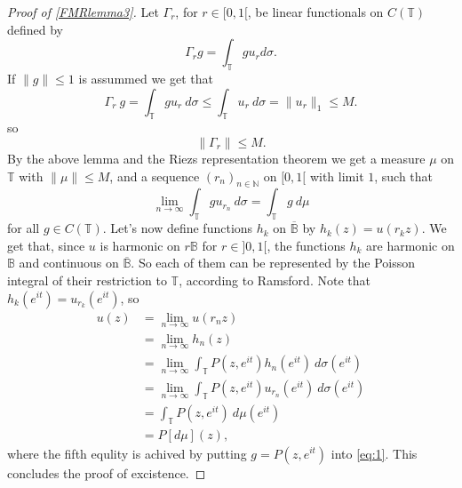 \documentclass[a4paper,12pt,twoside,BCOR=10mm]{scrbook}
\begin{document}
\begin{proof}[Proof of \ref{FMRlemma3}]
Let $\Gamma_r$, for $r \in [0, 1[$,  be linear functionals on $C(\mathbb{T})$ defined by
\[
	\Gamma_r g = \int_{\mathbb{T}} gu_r d\sigma.
\]
If $\|g\| \leq 1$ is assummed we get that
\[
\Gamma_r\ g = \int_{\mathbb{T}} gu_r\ d\sigma \leq \int_{\mathbb{T}} u_r\ d\sigma = \|u_r\|_1 \leq M.
\]
so
\[
	\|\Gamma_r\| \leq M.
\]
By the above lemma %
and the Riezs representation theorem %
we get a measure $\mu$ on $\mathbb{T}$ with $\|\mu\| \leq M$, and a sequence $(r_n)_{n \in \mathbb{N}}$ on $[0, 1[$ with limit $1$, such that
\begin{equation}
	\label{eq:1}
	\lim_{n \rightarrow \infty} \int_{\mathbb{T}} gu_{r_n}\ d\sigma = \int_{\mathbb{T}}g\ d\mu
\end{equation}
for all $g \in C(\mathbb{T})$.
Let's now define functions $h_k$ on $\overline{\mathbb{B}}$ by $h_k(z) = u(r_kz)$.
We get that, since $u$ is harmonic on $r\mathbb{B}$ for $r \in ]0, 1[$, the functions $h_k$ are harmonic on $\mathbb{B}$ and continuous on $\overline{\mathbb{B}}$.
So each of them can be represented by the Poisson integral of their restriction to $\mathbb{T}$, according to Ramsford. %
Note that $h_k(e^{it}) = u_{r_k}(e^{it})$, so
\begin{align*}
	u(z)
	&= \lim_{n \rightarrow \infty} u(r_nz)\\
	&= \lim_{n \rightarrow \infty} h_n(z)\\
	&= \lim_{n \rightarrow \infty} \int_{\mathbb{T}}P(z, e^{it}) h_n(e^{it})\ d\sigma(e^{it})\\
	&= \lim_{n \rightarrow \infty} \int_{\mathbb{T}}P(z, e^{it}) u_{r_n}(e^{it})\ d\sigma(e^{it})\\
	&= \int_{\mathbb{T}}P(z, e^{it})\ d\mu(e^{it})\\
	&= P[d\mu](z),
\end{align*}
where the fifth equlity is achived by putting $g = P(z, e^{it})$ into \ref{eq:1}.
This concludes the proof of excistence.


\end{proof}
\end{document}

